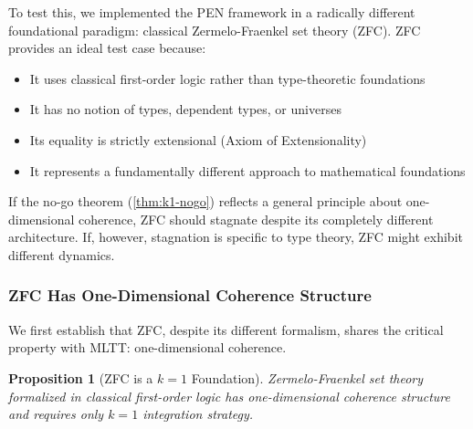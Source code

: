 \documentclass[11pt]{article}
\newtheorem{proposition}[theorem]{Proposition}
\theoremstyle{definition}
\theoremstyle{remark}
\begin{document}
To test this, we implemented the PEN framework in a radically different foundational paradigm: classical Zermelo-Fraenkel set theory (ZFC). ZFC provides an ideal test case because:
\begin{itemize}
\item It uses classical first-order logic rather than type-theoretic foundations
\item It has no notion of types, dependent types, or universes
\item Its equality is strictly extensional (Axiom of Extensionality)
\item It represents a fundamentally different approach to mathematical foundations
\end{itemize}

If the no-go theorem (\cref{thm:k1-nogo}) reflects a general principle about one-dimensional coherence, ZFC should stagnate despite its completely different architecture. If, however, stagnation is specific to type theory, ZFC might exhibit different dynamics.

\subsubsection{ZFC Has One-Dimensional Coherence Structure}

We first establish that ZFC, despite its different formalism, shares the critical property with MLTT: one-dimensional coherence.

\begin{proposition}[ZFC is a $k=1$ Foundation]
\label{prop:zfc-1d}
Zermelo-Fraenkel set theory formalized in classical first-order logic has one-dimensional coherence structure and requires only $k=1$ integration strategy.
\end{proposition}
\end{document}
